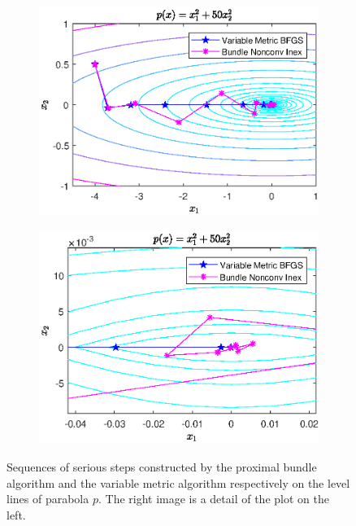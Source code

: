 \begin{figure}[H]
	\begin{subfigure}[t]{0.49\textwidth}
		\includegraphics[width=\textwidth]{Pictures/Plots/final_parab.eps}
	\end{subfigure}
	\begin{subfigure}[t]{0.49\textwidth}
			\includegraphics[width=\textwidth]{Pictures/Plots/final_parab_detail.eps}
	\end{subfigure}
	\caption{Sequences of serious steps constructed by the proximal bundle algorithm and the variable metric algorithm respectively on the level lines of parabola \(p\). The right image is a detail of the plot on the left.}
	\label{fig_contour_parab}
\end{figure}


